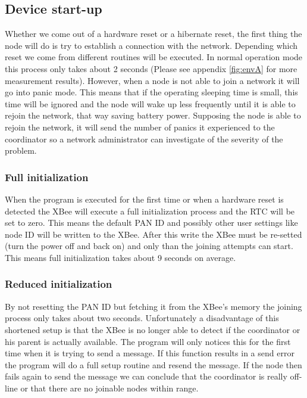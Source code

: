   
\subsection{Device start-up}
Whether we come out of a hardware reset or a hibernate reset, the first thing the node will do is try to establish a connection with the network. Depending which reset we come from different routines will be executed. In normal operation mode this process only takes about 2 seconds (Please see appendix \ref{fig:envA} for more measurement results). However, when a node is not able to join a network it will go into panic mode. This means that if the operating sleeping time is small, this time will be ignored and the node will wake up less frequently until it is able to rejoin the network, that way saving battery power. Supposing the node is able to rejoin the network, it will send the number of panics it experienced to the coordinator so a network administrator can investigate of the severity of the problem.

\subsubsection{Full initialization}
When the program is executed for the first time or when a hardware reset is detected the XBee will execute a full initialization process and the RTC will be set to zero. This means the default PAN ID and possibly other user settings like node ID will be written to the XBee. After this write the XBee must be re-setted (turn the power off and back on) and only than the joining attempts can start. This means full initialization takes about 9 seconds on average. 

\subsubsection{Reduced initialization}
By not resetting the PAN ID but fetching it from the XBee's memory the joining process only takes about two seconds. Unfortunately a disadvantage of this shortened setup is that the XBee is no longer able to detect if the coordinator or his parent is actually available. The program will only notices this for the first time when it is trying to send a message. If this function results in a send error the program will do a full setup routine and resend the message. If the node then fails again to send the message we can conclude that the coordinator is really off-line or that there are no joinable nodes within range. 




